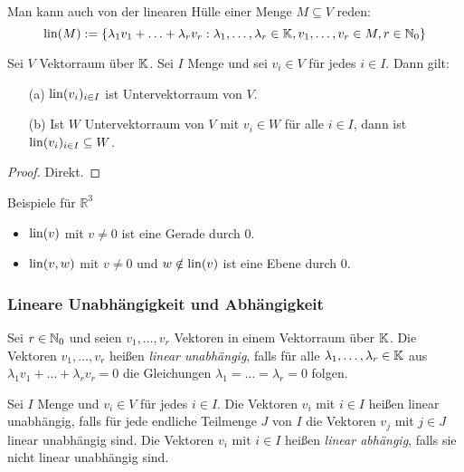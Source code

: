 Man kann auch von der linearen Hülle einer Menge $ M \subseteq V $ reden:
\begin{equation}
\operatorname{lin}(M) := \{ \lambda_1 v_1 + \ldots + \lambda_r v_r : \lambda_1, \ldots, \lambda_r \in \mathbb K, v_1, \ldots, v_r \in M, r \in \mathbb N_0 \}
\end{equation}


\begin{propn}
	Sei $ V $ Vektorraum über $ \mathbb K $. Sei $ I $ Menge und sei $ v_i \in V $ für jedes $ i \in I $. Dann gilt:
	\begin{itemize}
		\item[(a)]
			$ \operatorname{lin} (v_i)_{i \in I} $ ist Untervektorraum von $ V $.
		\item[(b)]
			Ist $ W $ Untervektorraum von $ V $ mit $ v_i \in W $ für alle $ i \in I $, dann ist $ \operatorname{lin} (v_i)_{i \in I} \subseteq W $.
	\end{itemize}
\end{propn}
\begin{proof}
	Direkt.
\end{proof}


\begin{bsp} Beispiele für $ \mathbb{R}^3 $
\begin{itemize}
	\item
		$ \operatorname{lin} (v) $ mit $ v \neq 0 $ ist eine Gerade durch $ 0 $.
	\item
		$ \operatorname{lin} (v,w) $ mit $ v \neq 0 $ und $ w \notin \operatorname{lin}(v) $ ist eine Ebene durch $ 0 $.
\end{itemize}
\end{bsp} 


\subsubsection{Lineare Unabhängigkeit und Abhängigkeit}

Sei $ r \in \mathbb N_0 $ und seien $ v_1, \ldots, v_r $ Vektoren in einem Vektorraum über $ \mathbb K $. Die Vektoren $ v_1, \ldots, v_r $ heißen \emph{linear unabhängig}, falls für alle $ \lambda_1, \ldots, \lambda_r \in \mathbb K $ aus $ \lambda_1v_1 + \ldots + \lambda_rv_r = 0 $ die Gleichungen $ \lambda_1 = \ldots = \lambda_r = 0 $ folgen.

Sei $ I $ Menge und $ v_i \in V $ für jedes $ i \in I $. Die Vektoren $ v_i $ mit $ i \in I $ heißen linear unabhängig, falls für jede endliche Teilmenge $ J $ von $ I $ die Vektoren $ v_j $ mit $ j \in J $ linear unabhängig sind. Die Vektoren $ v_i $ mit $ i \in I $ heißen \emph{linear abhängig}, falls sie nicht linear unabhängig sind. 

